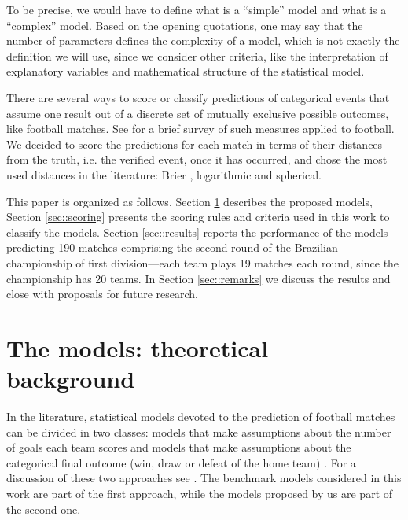 \documentclass[journal,article,accept,moreauthors,pdftex,12pt,a4paper]{mdpi}
\begin{document}
    {\color{red} To be precise, we would have to define what is a ``simple'' model and what is a ``complex'' model. Based on the opening quotations, one may say that the number of parameters defines the complexity of a model, which is not exactly the definition we will use, since we consider other criteria, like the interpretation of explanatory variables and mathematical structure of the statistical model.}


    There are several ways to score or classify predictions of categorical events that assume one result out of a discrete set of mutually exclusive possible outcomes, like football matches.
    See \cite{constantinou} for a brief survey of such measures applied to football.
    We decided to score the predictions for each match in terms of their distances from the truth, i.e. the verified event, once it has occurred, and chose the most used distances in the literature: Brier \cite{brier1950}, logarithmic and spherical.

    This paper is organized as follows.
    Section \ref{sec::experimental} describes the proposed models, Section \ref{sec::scoring} presents the scoring rules and criteria used in this work to classify the models.
    Section \ref{sec::results} reports the performance of the models predicting 190 matches comprising the second round of the Brazilian championship of first division---{\color{red}each team plays 19 matches each round, since the championship has 20 teams.}
    In Section \ref{sec::remarks} we discuss the results and close with proposals for future research.



    \section{The models: theoretical background}
    \label{sec::experimental}

    In the literature, statistical models devoted to the prediction of
    football matches can be divided in two classes: models that make
    assumptions about the number of goals each team scores
    \citep{Maher82, Dixon97, Lee97, Karlis2003} and models that make
    assumptions about the categorical final outcome (win, draw or defeat
    of the home team) \citep{Forrest2000, Koning2000, Brillinger2008,
        Brillinger2009}. For a discussion of these two approaches see
    \cite{Goddard2005}. The benchmark models considered in this work are
    part of the first approach, while the models proposed by us are part
    of the second one.
\end{document}
